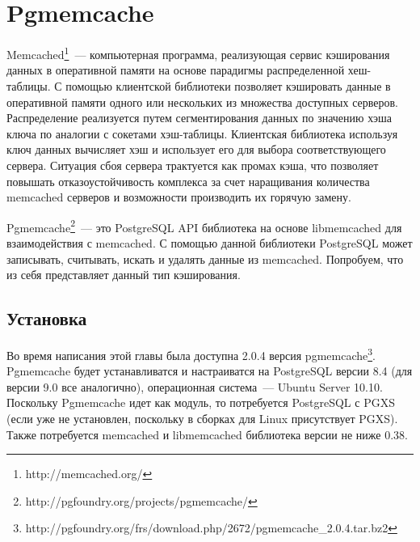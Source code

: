 \section{Pgmemcache}
Memcached\footnote{http://memcached.org/}~--- 
компьютерная программа, реализующая сервис кэширования данных в оперативной памяти на основе 
парадигмы распределенной хеш-таблицы. С помощью клиентской библиотеки позволяет кэшировать данные в оперативной 
памяти одного или нескольких из множества доступных серверов. Распределение реализуется путем сегментирования 
данных по значению хэша ключа по аналогии с сокетами хэш-таблицы. Клиентская библиотека используя ключ данных 
вычисляет хэш и использует его для выбора соответствующего сервера. Ситуация сбоя сервера трактуется как промах 
кэша, что позволяет повышать отказоустойчивость комплекса за счет наращивания количества memcached серверов и возможности 
производить их горячую замену.

Pgmemcache\footnote{http://pgfoundry.org/projects/pgmemcache/}~--- это 
PostgreSQL API библиотека на основе libmemcached для взаимодействия с memcached. С помощью данной библиотеки 
PostgreSQL может записывать, считывать, искать и удалять данные из memcached. Попробуем, что из себя представляет данный тип кэширования.


\subsection{Установка}
Во время написания этой главы была доступна 2.0.4 версия 
pgmemcache\footnote{http://pgfoundry.org/frs/download.php/2672/pgmemcache\_2.0.4.tar.bz2}. 
Pgmemcache будет устанавливатся и настраиватся на PostgreSQL версии 8.4 (для версии 9.0 все аналогично), 
операционная система~--- Ubuntu Server 10.10. Поскольку Pgmemcache идет как модуль, 
то потребуется PostgreSQL с PGXS (если уже не установлен, поскольку в сборках для Linux присутствует PGXS). 
Также потребуется memcached и libmemcached библиотека версии не ниже 0.38. 

